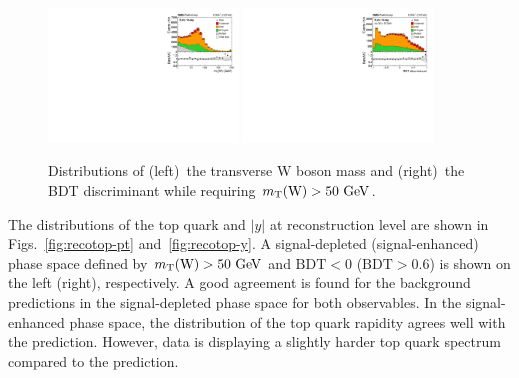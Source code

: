 \documentclass[12pt]{article}
\begin{document}
\begin{figure}[!htbp]
\begin{center}
\includegraphics[width=0.45\textwidth]{figures/fit/reco_mtw.pdf}\hspace{0.05\textwidth}
\includegraphics[width=0.45\textwidth]{figures/fit/reco_BDT.pdf}
\end{center}

\caption{\label{fig:mtwbdt}Distributions of (left)~the transverse W boson mass and (right)~the BDT discriminant while requiring $m_{\mathrm{T}}(\mathrm{W})>50~\mathrm{GeV}$.}
\end{figure}

The distributions of the top quark \pt and $|y|$ at reconstruction level are shown in Figs.~\ref{fig:recotop-pt} and~\ref{fig:recotop-y}. A signal-depleted (signal-enhanced) phase space defined by $m_{\mathrm{T}}(\mathrm{W})>50~\mathrm{GeV}$ and $\mathrm{BDT}<0$ ($\mathrm{BDT}>0.6$) is shown on the left (right), respectively. A good agreement is found for the background predictions in the signal-depleted phase space for both observables. In the signal-enhanced phase space, the distribution of the top quark rapidity agrees well with the prediction. However, data is displaying a slightly harder top quark \pt spectrum compared to the prediction.
\end{document}
